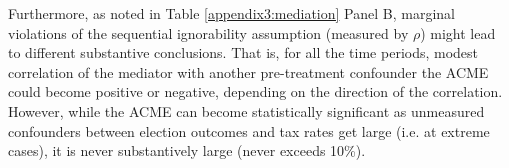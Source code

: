 Furthermore, as noted in Table \ref{appendix3:mediation} Panel B, marginal violations of the sequential ignorability assumption (measured by $\rho$) might lead to different substantive conclusions. That is, for all the time periods, modest correlation of the mediator with another pre-treatment confounder the ACME could become positive or negative, depending on the direction of the correlation. However, while the ACME can become statistically significant as unmeasured confounders between election outcomes and tax rates get large (i.e. at extreme cases), it is never substantively large (never exceeds 10\%). 


\begin{table}[H]
\centering
\caption{Causal Mediation Analysis: Cumulative violence, electoral outcomes, and property tax performance }
\label{appendix3:mediation}
\end{table}
